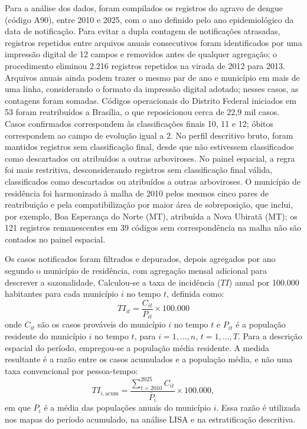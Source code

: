 Para a análise dos dados, foram compilados os registros do agravo de dengue (código A90), entre 2010 e 2025, com o ano definido pelo ano epidemiológico da data de notificação. Para evitar a dupla contagem de notificações atrasadas, registros repetidos entre arquivos anuais consecutivos foram identificados por uma impressão digital de 12 campos e removidos antes de qualquer agregação; o procedimento eliminou 2.216 registros repetidos na virada de 2012 para 2013. Arquivos anuais ainda podem trazer o mesmo par de ano e município em mais de uma linha, considerando o formato da impressão digital adotado; nesses casos, as contagens foram somadas. Códigos operacionais do Distrito Federal iniciados em 53 foram reatribuídos a Brasília, o que reposicionou cerca de 22,9 mil casos. Casos confirmados correspondem às classificações finais 10, 11 e 12; óbitos correspondem ao campo de evolução igual a 2. No perfil descritivo bruto, foram mantidos registros sem classificação final, desde que não estivessem classificados como descartados ou atribuídos a outras arboviroses. No painel espacial, a regra foi mais restritiva, desconsiderando registros sem classificação final válida, classificados como descartados ou atribuídos a outras arboviroses. O município de residência foi harmonizado à malha de 2010 pelos mesmos cinco pares de reatribuição e pela compatibilização por maior área de sobreposição, que inclui, por exemplo, Boa Esperança do Norte (MT), atribuída a Nova Ubiratã (MT); os 121 registros remanescentes em 39 códigos sem correspondência na malha não são contados no painel espacial.

Os casos notificados foram filtrados e depurados, depois agregados por ano segundo o município de residência, com agregação mensal adicional para descrever a sazonalidade. Calculou-se a taxa de incidência ($TI$) anual por 100.000 habitantes para cada município $i$ no tempo $t$, definida como:
 \begin{equation}
    TI_{it} = \frac{C_{it}}{P_{it}} \times 100.000
 \end{equation}
onde $C_{it}$ são os casos prováveis do município $i$ no tempo $t$ e $P_{it}$ é a população residente do município $i$ no tempo $t$, para $i = 1, \ldots, n$, $t = 1, \ldots, T$. Para a descrição espacial do período, empregou-se a população média residente. A medida resultante é a razão entre os casos acumulados e a população média, e não uma taxa convencional por pessoa-tempo:
\begin{equation}
    TI_{i,\mathrm{acum}} = \frac{\sum_{t=2010}^{2025} C_{it}}{\overline{P}_i} \times 100.000,
    \label{eq:ti_acum}
\end{equation}
em que $\overline{P}_i$ é a média das populações anuais do município $i$. Essa razão é utilizada nos mapas do período acumulado, na análise LISA e na estratificação descritiva.

